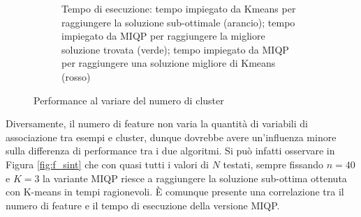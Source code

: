 \documentclass{article}
\begin{document}
\begin{figure}[H]
\begin{subfigure}[t]{0.49\linewidth}
         \caption{Tempo di esecuzione: tempo impiegato da Kmeans per raggiungere la soluzione sub-ottimale (arancio); tempo impiegato da MIQP per raggiungere la migliore soluzione trovata (verde); tempo impiegato da MIQP per raggiungere una soluzione migliore di Kmeans (rosso)}
     \end{subfigure}
        \caption{Performance al variare del numero di cluster}
        \label{fig:k_sint}
     \end{figure}
    Diversamente, il numero di feature non varia la quantità di variabili di associazione tra esempi e cluster, dunque dovrebbe avere un'influenza minore sulla differenza di performance tra i due algoritmi. Si può infatti osservare in Figura \ref{fig:f_sint} che con quasi tutti i valori di $N$ testati, sempre fissando $n=40$ e $K=3$ la variante MIQP riesce a raggiungere la soluzione sub-ottima ottenuta con K-means in tempi ragionevoli. È comunque presente una correlazione tra il numero di feature e il tempo di esecuzione della versione MIQP.\\
\end{document}
